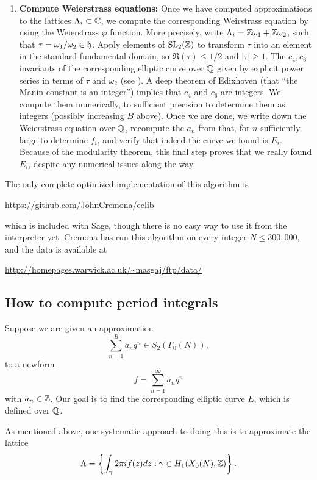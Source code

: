\documentclass{book}
\begin{document}
\begin{enumerate}
\item \label{step:alle_curve}
{\bf Compute Weierstrass equations:}
Once we have computed approximations to the
lattices $\Lambda_i\subset \mathbb{C}$, we compute
the corresponding Weirstrass equation
by using the Weierstrass $\wp$ function.
More precisely, write $\Lambda_i = \mathbb{Z} \omega_1 +\mathbb{Z}\omega_2$,
such that $\tau=\omega_1/\omega_2\in\mathfrak{h}$.
Apply elements of $\operatorname{SL}_2(\mathbb{Z})$ to transform
$\tau$ into an element in the standard
fundamental domain, so $\Re(\tau)\leq 1/2$ and
$|\tau|\geq 1$.
The $c_4, c_6$ invariants of the corresponding
elliptic curve over $\mathbb{Q}$ given by explicit
power series in terms of $\tau$ and $\omega_2$
(see \cite[\S2.14]{cremona:algs}).
A deep theorem of Edixhoven (that ``the Manin constant
is an integer'') implies that $c_4$ and $c_6$
are integers.  We compute them numerically,
to sufficient precision to determine them
as integers (possibly increasing $B$ above).
Once we are done, we write down the Weierstrass
equation over $\mathbb{Q}$, recompute
the $a_n$ from that, for $n$ sufficiently large to
determine $f_i$, and verify that indeed
the curve we found is $E_i$.  Because of the
modularity theorem, this final step
proves that we really found $E_i$, despite any
numerical issues along the way.
\end{enumerate}


The only complete optimized implementation
of this algorithm is
\begin{center}
\url{https://github.com/JohnCremona/eclib}
\end{center}
which is included with Sage, though there is no easy
way to use it from the interpreter yet.
Cremona has run this algorithm on every integer
$N\leq 300,\!000$, and the data is available
at
\begin{center}
\url{http://homepages.warwick.ac.uk/~masgaj/ftp/data/}
\end{center}

\subsection{How to compute period integrals}

Suppose we are given an approximation
$$
  \sum_{n=1}^{B} a_n q^n \in S_2(\Gamma_0(N)),
$$
to a newform
$$
  f= \sum_{n=1}^{\infty} a_n q^n
$$
with $a_n\in\mathbb{Z}$.  Our goal is to find the corresponding
elliptic curve $E$, which is defined over $\mathbb{Q}$.

As mentioned above, one systematic approach to doing this
is to approximate the lattice
$$
\Lambda = \left\{\int_{\gamma} 2\pi i f(z) dz :
\gamma \in H_1(X_0(N),\mathbb{Z})\right\}.
$$
\end{document}
